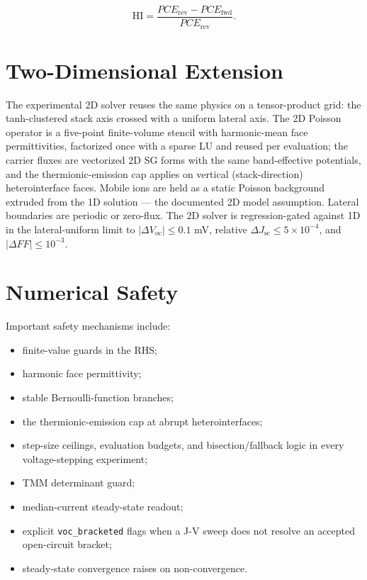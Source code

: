 \documentclass[
  11pt,
  american,
]{report}
\providecommand{\tightlist}{%
  \setlength{\itemsep}{0pt}\setlength{\parskip}{0pt}}
\begin{document}
\[
\mathrm{HI}
=
\frac{PCE_\mathrm{rev}-PCE_\mathrm{fwd}}{PCE_\mathrm{rev}} .
\]

\hypertarget{two-dimensional-extension}{%
\section{Two-Dimensional Extension}\label{two-dimensional-extension}}

The experimental 2D solver reuses the same physics on a tensor-product
grid: the tanh-clustered stack axis crossed with a uniform lateral axis.
The 2D Poisson operator is a five-point finite-volume stencil with
harmonic-mean face permittivities, factorized once with a sparse LU and
reused per evaluation; the carrier fluxes are vectorized 2D SG forms
with the same band-effective potentials, and the thermionic-emission cap
applies on vertical (stack-direction) heterointerface faces. Mobile ions
are held as a static Poisson background extruded from the 1D solution
--- the documented 2D model assumption. Lateral boundaries are periodic
or zero-flux. The 2D solver is regression-gated against 1D in the
lateral-uniform limit to \(|\Delta V_\mathrm{oc}| \leq 0.1\) mV,
relative \(\Delta J_\mathrm{sc} \leq 5\times10^{-4}\), and
\(|\Delta FF| \leq 10^{-3}\).

\hypertarget{numerical-safety}{%
\section{Numerical Safety}\label{numerical-safety}}

Important safety mechanisms include:

\begin{itemize}
\tightlist
\item
  finite-value guards in the RHS;
\item
  harmonic face permittivity;
\item
  stable Bernoulli-function branches;
\item
  the thermionic-emission cap at abrupt heterointerfaces;
\item
  step-size ceilings, evaluation budgets, and bisection/fallback logic
  in every voltage-stepping experiment;
\item
  TMM determinant guard;
\item
  median-current steady-state readout;
\item
  explicit \texttt{voc\_bracketed} flags when a J-V sweep does not
  resolve an accepted open-circuit bracket;
\item
  steady-state convergence raises on non-convergence.
\end{itemize}
\end{document}
